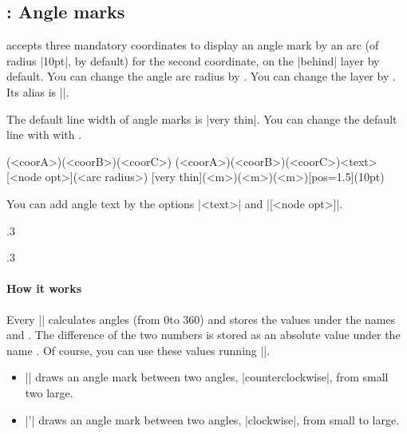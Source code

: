 \subsection{\protect{}: Angle marks}
\label{ss:tzanglemark}

\icmd{\tzanglemark} accepts three mandatory coordinates to display an angle mark by an arc (of radius |10pt|, by default) for the second coordinate, on the |behind| layer by default.
You can change the angle arc radius by \icmd{\settzAAradius}.
You can change the layer by \icmd{\settzanglelayer}. Its alias is |\settzanglemarklayer|.

The default line width of angle marks is |very thin|. You can change the default line with with \icmd{\settzAAlinestyle}.

\begin{tzdef}{}
\tzanglemark(<coorA>)(<coorB>)(<coorC>)
\tzanglemark[<opt>](<coorA>)(<coorB>)(<coorC>){<text>}[<node opt>](<arc radius>)
  [very thin](<m>)(<m>)(<m>){}[pos=1.5](10pt)
\end{tzdef}

You can add angle text by the options |{<text>}| and |[<node opt>]|.

\begin{tzcode}{.3}
\end{tzcode}

\begin{tzcode}{.3}
{}
\end{tzcode}


\paragraph{How it works} Every |\tzanglemark| calculates angles (from 0\textdegree to 360\textdegree) and stores the values under the names \icmd{\tzangleONE} and \icmd{\tzangleTWO}. The difference of the two numbers is stored as an absolute value under the name \icmd{\tzangleresult}.
Of course, you can use these values  running |\tzanglemark|.
\begin{itemize}\firmlist
\item |\tzanglemark| draws an angle mark between two angles, |counterclockwise|, from small two large.
\item |\tzanglemark'| draws an angle mark between two angles, |clockwise|, from small to large.
\end{itemize}

